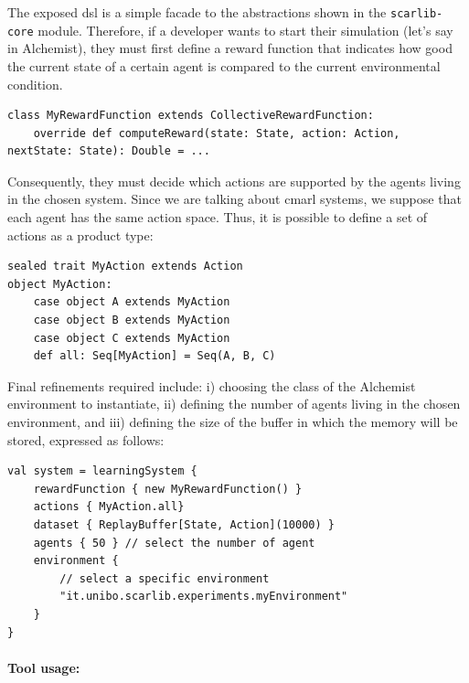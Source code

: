 The exposed \ac{dsl} is a simple facade 
 to the abstractions shown in the \texttt{scarlib-core} module. 
Therefore, if a developer wants to start their simulation 
 (let's say in Alchemist), 
 they must first define a reward function that indicates 
 how good the current state of a certain agent 
 is compared to the current environmental condition.
\begin{lstlisting}
class MyRewardFunction extends CollectiveRewardFunction:
    override def computeReward(state: State, action: Action, nextState: State): Double = ...
\end{lstlisting}
Consequently, they must decide which actions are supported 
 by the agents living in the chosen system. 
%
Since we are talking about \ac{cmarl} systems, 
 we suppose that each agent has the same action space. 
 Thus, it is possible to define a set of actions as a product type:
\begin{lstlisting}
sealed trait MyAction extends Action
object MyAction:
    case object A extends MyAction
    case object B extends MyAction
    case object C extends MyAction
    def all: Seq[MyAction] = Seq(A, B, C)
\end{lstlisting}
Final refinements required include: 
i) choosing the class of the Alchemist environment to instantiate, 
ii) defining the number of agents living in the chosen environment, and 
iii) defining the size of the buffer in which the memory will be stored,
expressed as follows:
\begin{lstlisting}
val system = learningSystem {
    rewardFunction { new MyRewardFunction() }
    actions { MyAction.all}
    dataset { ReplayBuffer[State, Action](10000) }
    agents { 50 } // select the number of agent
    environment {
        // select a specific environment
        "it.unibo.scarlib.experiments.myEnvironment"
    }
}
\end{lstlisting}

\paragraph{Tool usage:}

